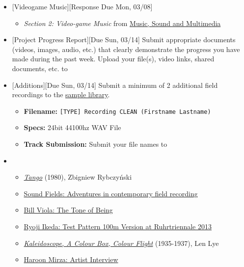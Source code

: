 \def\dMon{Mon, 03/08}
\def\dTues{Tues, 03/09}
\def\dWed{Wed, 03/10}
\def\dThur{Thur, 03/11}
\def\dFri{Fri, 03/12}
\def\dSat{Sat, 03/13}
\def\dSun{Sun, 03/14}
\placeDate

\begin{itemize}[noitemsep,topsep=0pt,leftmargin=*]
	\item {}[Videogame Music][Response Due \dMon]
	      \begin{itemize}
		      \item \emph{Section 2: Video-game Music} from \href{supplements/Music_Sound_and_Multimedia_-_From_the_Live_to_the_Virtual_(Music_and_the_Moving_Image)_(2008).pdf}{Music, Sound and Multimedia}
	      \end{itemize}

	\item {}[Project Progress Report][Due \dSun] \newline
	      Submit appropriate documents (videos, images, audio, etc.) that clearly demonstrate the progress you have made during the past week. Upload your file(s), video links, shared documents, etc. to \discordE
	\item {}[Additions][Due \dSun] \newline
	      Submit a minimum of 2 additional field recordings to the \href{\samplelibPermURL}{sample library}.
	      \begin{itemize}
		      \item \textbf{Filename:} \texttt{[TYPE] Recording CLEAN (Firstname Lastname)}
		      \item \textbf{Specs:} 24bit 44100hz WAV File
		      \item \textbf{Track Submission:} Submit your file names to \discordS
	      \end{itemize}
	\item {}
	      \begin{itemize}
		      \item \href{https://www.youtube.com/watch?v=u0pEpA_Y1a4}{\emph{Tango}} (1980), Zbigniew Rybczyński
		      \item \href{https://www.youtube.com/watch?v=esfUwg1-xrI}{Sound Fields: Adventures in contemporary field recording}
		      \item \href{https://vimeo.com/64302190}{Bill Viola: The Tone of Being}
		      \item \href{https://www.youtube.com/watch?v=XwjlYpJCBgk}{Ryoji Ikeda: Test Pattern 100m Version at Ruhrtriennale 2013}
		      \item \href{https://www.youtube.com/watch?v=-DksmbDMDUU}{\emph{Kaleidoscope, A Colour Box, Colour Flight}} (1935-1937), Len Lye
		      \item \href{https://www.youtube.com/watch?v=Y8Zpr1ESEO4}{Haroon Mirza: Artist Interview}
	      \end{itemize}
\end{itemize}